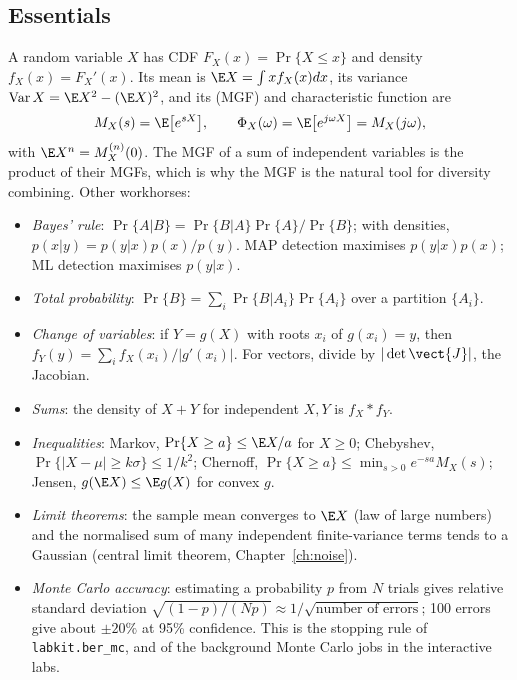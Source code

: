 \subsection{Essentials}

A random variable $X$ has CDF $F_X(x)=\Pr\{X\le x\}$ and density $f_X(x)=F_X'(x)$. Its mean is
$\E X=\int xf_X(x)dx$, its variance $\operatorname{Var}X=\E X^2-(\E X)^2$, and its
 (MGF) and characteristic function are
\begin{equation}
M_X(s)=\E\big[e^{sX}\big],\qquad \Phi_X(\omega)=\E\big[e^{j\omega X}\big]=M_X(j\omega),
\end{equation}
with $\E X^n=M_X^{(n)}(0)$. The MGF of a sum of independent variables is the product of their
MGFs, which is why the MGF is the natural tool for diversity combining. Other workhorses:

\begin{itemize}[leftmargin=1.5em,itemsep=2pt]
\item \emph{Bayes' rule}: $\Pr\{A|B\}=\Pr\{B|A\}\Pr\{A\}/\Pr\{B\}$; with densities,
$p(x|y)=p(y|x)p(x)/p(y)$. MAP detection maximises $p(y|x)p(x)$; ML detection maximises $p(y|x)$.
\item \emph{Total probability}: $\Pr\{B\}=\sum_i\Pr\{B|A_i\}\Pr\{A_i\}$ over a partition $\{A_i\}$.
\item \emph{Change of variables}: if $Y=g(X)$ with roots $x_i$ of $g(x_i)=y$, then
$f_Y(y)=\sum_if_X(x_i)/|g'(x_i)|$. For vectors, divide by $|\det\vect{J}|$, the Jacobian.
\item \emph{Sums}: the density of $X+Y$ for independent $X,Y$ is $f_X*f_Y$.
\item \emph{Inequalities}: Markov, $\Pr\{X\ge a\}\le\E X/a$ for $X\ge0$; Chebyshev,
$\Pr\{|X-\mu|\ge k\sigma\}\le1/k^2$; Chernoff, $\Pr\{X\ge a\}\le\min_{s>0}e^{-sa}M_X(s)$;
Jensen, $g(\E X)\le\E g(X)$ for convex $g$.
\item \emph{Limit theorems}: the sample mean converges to $\E X$ (law of large numbers) and the
normalised sum of many independent finite-variance terms tends to a Gaussian (central limit
theorem, Chapter~\ref{ch:noise}).
\item \emph{Monte Carlo accuracy}: estimating a probability $p$ from $N$ trials gives relative
standard deviation $\sqrt{(1-p)/(Np)}\approx1/\sqrt{\text{number of errors}}$; 100 errors give
about $\pm20\%$ at 95\% confidence. This is the stopping rule of \texttt{labkit.ber\_mc}, and of the
background Monte Carlo jobs in the interactive labs.
\end{itemize}


